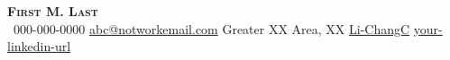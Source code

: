 \begin{center}
    \textbf{\Huge \scshape First M. Last} \\ \vspace{1pt}
     \ \small 000-000-0000 \quad
    \href{abc@notschoolemail.com}{ \small abc@notworkemail.com} \quad
     \small Greater XX Area, XX \quad
     \small \href{https://github.com/Li-ChangC}{Li-ChangC}  \quad
     \small \href{https://www.linkedin.com/in/your-linkedin-url}{your-linkedin-url}    \quad
\end{center}
